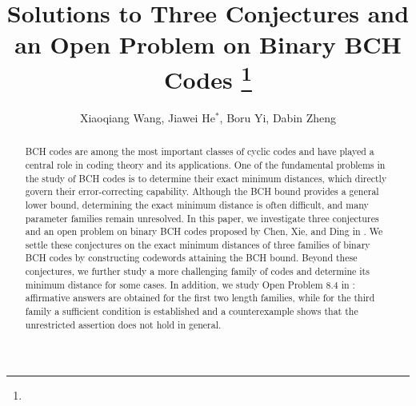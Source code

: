 \documentclass[12pt,draftcls,journal,onecolumn]{IEEEtran}
\begin{document}
\title{Solutions to Three Conjectures and an Open Problem on Binary BCH Codes
\thanks{
}
}
\author{Xiaoqiang Wang, Jiawei He$^*$, Boru Yi, Dabin Zheng}

\renewcommand{\thefootnote}{\empty}%







\maketitle


\begin{abstract}

 BCH codes are among the most important classes of cyclic codes and have played a central role in coding theory and its applications.
One of the fundamental problems in the study of BCH codes is to determine their exact minimum distances, which directly govern their error-correcting capability.
Although the BCH bound provides a general lower bound, determining the exact minimum distance is often difficult, and many parameter families remain unresolved. In this paper, we investigate three conjectures and an open problem on binary BCH codes proposed by Chen, Xie, and Ding in \cite{Chen59}. We settle these conjectures on the exact minimum distances of three families of binary BCH codes by constructing codewords attaining the BCH bound. Beyond these conjectures, we further study a more challenging family of codes
and determine its minimum distance for some cases. In addition, we study Open Problem 8.4 in \cite{Chen59}: affirmative answers are obtained for the first two length families, while for the third family a sufficient condition is established and a counterexample shows that the unrestricted assertion does not hold in general.
\end{abstract}
\end{document}
